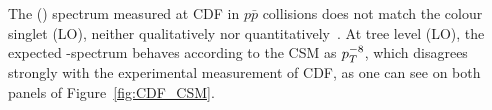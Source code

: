 The \pt(\Jpsi) spectrum measured at CDF in $p\bar{p}$
collisions does not match the colour singlet (LO), neither
qualitatively nor quantitatively~\cite{CDFpsi}. At tree level (LO), the expected
\pt-spectrum behaves according to the CSM as $p_{T}^{-8}$, which disagrees strongly
with the experimental measurement of CDF, as one can see on both
panels of Figure~\ref{fig:CDF_CSM}.

